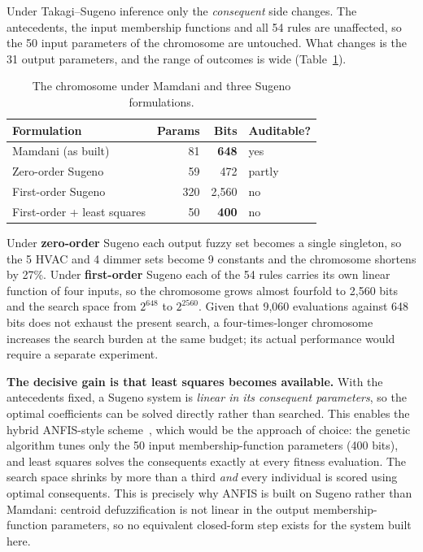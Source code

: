 Under Takagi--Sugeno inference only the \emph{consequent} side changes. The
antecedents, the input membership functions and all 54 rules are unaffected, so
the 50 input parameters of the chromosome are untouched. What changes is the 31
output parameters, and the range of outcomes is wide
(Table~\ref{tab:t2-sugeno}).

\begin{table}[t]
\caption{The chromosome under Mamdani and three Sugeno formulations.}
\label{tab:t2-sugeno}
\centering
\small
\begin{tabular}{@{}lrrl@{}}
\toprule
\textbf{Formulation} & \textbf{Params} & \textbf{Bits} &
\textbf{Auditable?} \\
\midrule
Mamdani (as built)          & 81  & \textbf{648}   & yes \\
Zero-order Sugeno           & 59  & 472            & partly \\
First-order Sugeno          & 320 & 2{,}560        & no \\
First-order + least squares & 50  & \textbf{400}   & no \\
\bottomrule
\end{tabular}
\end{table}

Under \textbf{zero-order} Sugeno each output fuzzy set becomes a single
singleton, so the 5 HVAC and 4 dimmer sets become 9 constants and the chromosome
shortens by 27\%. Under \textbf{first-order} Sugeno each of the 54 rules carries
its own linear function of four inputs, so the chromosome grows almost fourfold
to 2{,}560 bits and the search space from $2^{648}$ to $2^{2560}$. Given that
9{,}060 evaluations against 648 bits does not exhaust the present search, a
four-times-longer chromosome increases the search burden at the same budget;
its actual performance would require a separate experiment.

\textbf{The decisive gain is that least squares becomes available.} With the
antecedents fixed, a Sugeno system is \emph{linear in its consequent
parameters}, so the optimal coefficients can be solved directly rather than
searched. This enables the hybrid ANFIS-style scheme~\cite{jang1993}, which
would be the approach of choice: the genetic algorithm tunes only the 50 input
membership-function parameters (400 bits), and least squares solves the
consequents exactly at every fitness evaluation. The search space shrinks by
more than a third \emph{and} every individual is scored using optimal
consequents. This is precisely why ANFIS is built on Sugeno rather than Mamdani:
centroid defuzzification is not linear in the output membership-function
parameters, so no equivalent closed-form step exists for the system built here.

